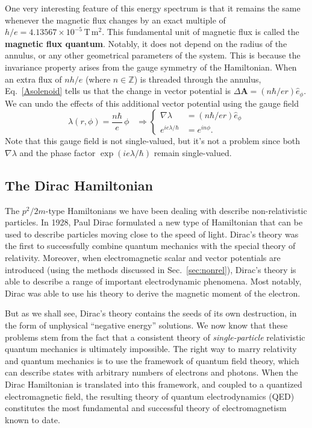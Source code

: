 \documentclass[pra,12pt]{revtex4}
\begin{document}
One very interesting feature of this energy spectrum is that it
remains the same whenever the magnetic flux changes by an exact
multiple of $h/e = 4.13567\times10^{-5}\,\mathrm{T}\,\mathrm{m}^2$.
This fundamental unit of magnetic flux is called the \textbf{magnetic
  flux quantum}.  Notably, it does not depend on the radius of the
annulus, or any other geometrical parameters of the system.  This is
because the invariance property arises from the gauge symmetry of the
Hamiltonian.  When an extra flux of $nh/e$ (where $n\in\mathbb{Z}$) is
threaded through the annulus, Eq.~\eqref{Asolenoid} tells us that the
change in vector potential is $\Delta \mathbf{A} = (n\hbar/ e r)
\hat{e}_\phi$.  We can undo the effects of this additional vector
potential using the gauge field
\begin{equation}
  \lambda(r,\phi) = \frac{n\hbar}{e} \, \phi \;\;\;\Rightarrow
  \begin{cases}\nabla \lambda &= \displaystyle (n\hbar/er) \hat{e}_\phi
    \\ \displaystyle e^{ie\lambda/\hbar} &= \displaystyle e^{in\phi}.
  \end{cases}
\end{equation}
Note that this gauge field is not single-valued, but it's not a
problem since both $\nabla\lambda$ and the phase factor
$\exp(ie\lambda/\hbar)$ remain single-valued.

\subsection{The Dirac Hamiltonian}
\label{sec:DiracH}

The $p^2/2m$-type Hamiltonians we have been dealing with describe
non-relativistic particles.  In 1928, Paul Dirac formulated a new type
of Hamiltonian that can be used to describe particles moving close to
the speed of light.  Dirac's theory was the first to successfully
combine quantum mechanics with the special theory of relativity.
Moreover, when electromagnetic scalar and vector potentials are
introduced (using the methods discussed in Sec.~\ref{sec:nonrel}),
Dirac's theory is able to describe a range of important electrodynamic
phenomena.  Most notably, Dirac was able to use his theory to derive
the magnetic moment of the electron.

But as we shall see, Dirac's theory contains the seeds of its own
destruction, in the form of unphysical ``negative energy'' solutions.
We now know that these problems stem from the fact that a consistent
theory of \textit{single-particle} relativistic quantum mechanics is
ultimately impossible.  The right way to marry relativity and quantum
mechanics is to use the framework of quantum field theory, which can
describe states with arbitrary numbers of electrons and photons.  When
the Dirac Hamiltonian is translated into this framework, and coupled
to a quantized electromagnetic field, the resulting theory of quantum
electrodynamics (QED) constitutes the most fundamental and successful
theory of electromagnetism known to date.
\end{document}
